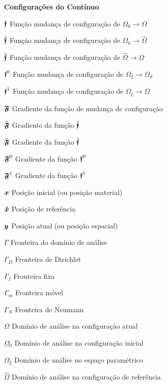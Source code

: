 \begin{simbolos}
    \item[\textbf{Configurações do Contínuo}]
    \item[$\boldsymbol{\mathfrak{f}}$] Função mudança de configuração de $\Omega_0\to\Omega$
    \item[$\tilde{\boldsymbol{\mathfrak{f}}}$] Função mudança de configuração de $\Omega_0\to\hat{\Omega}$
    \item[$\hat{\boldsymbol{\mathfrak{f}}}$] Função mudança de configuração de $\hat{\Omega}\to\Omega$
    \item[$\boldsymbol{\mathfrak{f}}^0$] Função mudança de configuração de $\Omega_\xi\to\Omega_0$
    \item[$\boldsymbol{\mathfrak{f}}^1$] Função mudança de configuração de $\Omega_\xi\to\Omega$
    \item[$\boldsymbol{\mathfrak{F}}$] Gradiente da função de mudança de configuração
    \item[$\tilde{\boldsymbol{\mathfrak{F}}}$] Gradiente da função $\tilde{\boldsymbol{\mathfrak{f}}}$
    \item[$\hat{\boldsymbol{\mathfrak{F}}}$] Gradiente da função $\hat{\boldsymbol{\mathfrak{f}}}$
    \item[$\boldsymbol{\mathfrak{F}}^0$] Gradiente da função $\boldsymbol{\mathfrak{f}}^0$
    \item[$\boldsymbol{\mathfrak{F}}^1$] Gradiente da função $\boldsymbol{\mathfrak{f}}^1$
    \item[$\boldsymbol{x}$] Posição inicial (ou posição material)
    \item[$\boldsymbol{\hat{x}}$] Posição de referência
    \item[$\boldsymbol{y}$] Posição atual (ou posição espacial)
    \item[$\Gamma$] Fronteira do domínio de análise
    \item[$\Gamma_D$] Fronteira de Dirichlet
    \item[$\Gamma_f$] Fronteira fixa
    \item[$\Gamma_m$] Fronteira móvel
    \item[$\Gamma_N$] Fronteira de Neumann
    \item[$\Omega$] Domínio de análise na configuração atual
    \item[$\Omega_0$] Domínio de análise na configuração inicial
    \item[$\Omega_\xi$] Domínio de análise no espaço paramétrico
    \item[$\hat{\Omega}$] Domínio de análise na configuração de referência


\end{simbolos}
